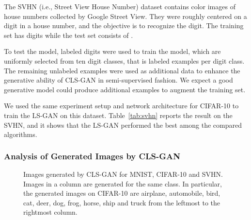 \documentclass[11pt,fullpage, letterpaper,twoside]{article}
\newcommand{\1}[1]{\mathds{1}_{\left[#1\right]}}
\begin{document}
The SVHN (i.e., Street View House Number) dataset \cite{netzer2011reading} contains  color images of house numbers collected by Google Street View. They were roughly centered on a digit in a house number, and the objective is to recognize the digit.  The training set has  digits while the test set consists of .

To test the model,  labeled digits were used to train the model, which are uniformly selected from ten digit classes, that is  labeled examples per digit class. The remaining unlabeled examples were used as additional data to enhance the generative ability of CLS-GAN in semi-supervised fashion.
We expect a good generative model could produce additional examples to augment the training set.

We used the same experiment setup and network architecture for CIFAR-10 to train the LS-GAN on this dataset.  Table~\ref{tab:svhn} reports the result on the SVHN, and it shows that the LS-GAN performed the best among the compared algorithms.



\subsubsection{Analysis of Generated Images by CLS-GAN}

\begin{figure*}[t]
\centering
{}\hspace{4mm}
\hspace{4mm}
\caption{Images generated by CLS-GAN for MNIST, CIFAR-10 and SVHN. Images in a column are generated for the same class. In particular, the generated images on CIFAR-10 are airplane, automobile, bird, cat, deer, dog, frog, horse, ship and truck from the leftmost to the rightmost column.}\label{fig:generation}
\label{Fig:dRNN}
\end{figure*}
\end{document}
